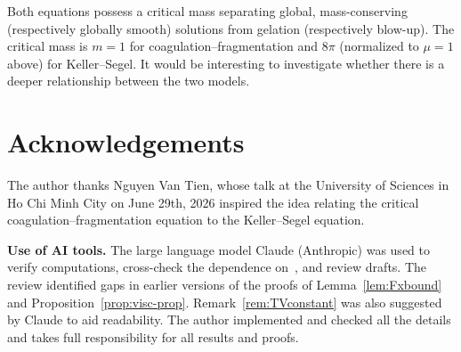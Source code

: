 \documentclass[12pt]{amsart}
\numberwithin{equation}{section}
\theoremstyle{plain}
\theoremstyle{definition}
\begin{document}
Both equations possess a critical mass separating global,
mass-conserving (respectively globally smooth) solutions from gelation
(respectively blow-up). The critical mass is $m=1$ for
coagulation--fragmentation and
$8\pi$ (normalized to $\mu=1$ above) for Keller--Segel.
It would be interesting to investigate whether there is
a deeper relationship between the two models.

\section*{Acknowledgements}
The author thanks Nguyen Van Tien, whose talk at the University of
Sciences in Ho Chi Minh City on June 29th, 2026 inspired the
idea relating the critical coagulation--fragmentation equation to the
Keller--Segel equation.

\medskip
\noindent\textbf{Use of AI tools.}
The large language model Claude (Anthropic) was used to verify
computations, cross-check the dependence on~\cite{TV}, and review
drafts. The review identified gaps in earlier versions of the proofs
of Lemma~\ref{lem:Fxbound} and Proposition~\ref{prop:visc-prop}.
Remark~\ref{rem:TVconstant} was also suggested by Claude to aid
readability. The author implemented and checked all the details and
takes full responsibility for all results and proofs.

\printbibliography
\end{document}
